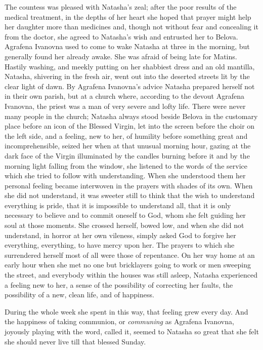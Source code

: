 The countess was pleased with Natasha's zeal; after the poor
results of the medical treatment, in the depths of her heart she
hoped that prayer might help her daughter more than medicines
and, though not without fear and concealing it from the doctor,
she agreed to Natasha's wish and entrusted her to
Belova. Agrafena Ivanovna used to come to wake Natasha at three
in the morning, but generally found her already awake. She was
afraid of being late for Matins. Hastily washing, and meekly
putting on her shabbiest dress and an old mantilla, Natasha,
shivering in the fresh air, went out into the deserted streets
lit by the clear light of dawn.  By Agrafena Ivanovna's advice
Natasha prepared herself not in their own parish, but at a church
where, according to the devout Agrafena Ivanovna, the priest was
a man of very severe and lofty life. There were never many people
in the church; Natasha always stood beside Belova in the
customary place before an icon of the Blessed Virgin, let into
the screen before the choir on the left side, and a feeling, new
to her, of humility before something great and incomprehensible,
seized her when at that unusual morning hour, gazing at the dark
face of the Virgin illuminated by the candles burning before it
and by the morning light falling from the window, she listened to
the words of the service which she tried to follow with
understanding. When she understood them her personal feeling
became interwoven in the prayers with shades of its own. When she
did not understand, it was sweeter still to think that the wish
to understand everything is pride, that it is impossible to
understand all, that it is only necessary to believe and to
commit oneself to God, whom she felt guiding her soul at those
moments. She crossed herself, bowed low, and when she did not
understand, in horror at her own vileness, simply asked God to
forgive her everything, everything, to have mercy upon her. The
prayers to which she surrendered herself most of all were those
of repentance. On her way home at an early hour when she met no
one but bricklayers going to work or men sweeping the street, and
everybody within the houses was still asleep, Natasha experienced
a feeling new to her, a sense of the possibility of correcting
her faults, the possibility of a new, clean life, and of
happiness.

During the whole week she spent in this way, that feeling grew
every day. And the happiness of taking communion, or
\emph{communing} as Agrafena Ivanovna, joyously playing with the
word, called it, seemed to Natasha so great that she felt she
should never live till that blessed Sunday.

